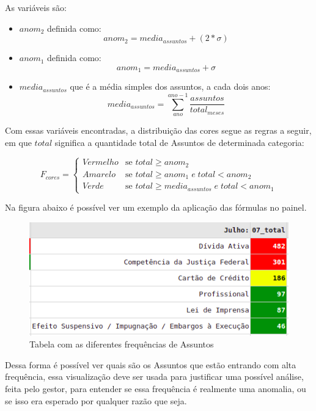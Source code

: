 As variáveis são:
\begin{itemize}
	\item $anom_2$ definida como: $$anom_2 = media_{assuntos} + (2*\sigma)$$
	
	\item $anom_1$ definida como: $$anom_1 = media_{assuntos} + \sigma$$
	
	\item $media_{assuntos}$ que é a média simples dos assuntos, a cada dois anos:
	$$media_{assuntos} = \sum\limits_{ano}^{ano-1}\frac{assuntos}{total_{meses}}$$
\end{itemize}

Com essas variáveis encontradas, a distribuição das cores segue as regras a seguir, em que $total$ significa a quantidade total de Assuntos de determinada categoria:

\begin{equation}
	F_{cores} =
	\begin{cases}
		Vermelho & \text{se $total \geq anom_2$}\\
		Amarelo & \text{se $total \geq anom_1 \;e\; total < anom_2$}\\
		Verde & \text{se $total \geq media_{assuntos} \;e\; total < anom_1$}
	\end{cases}       
\end{equation}

Na figura abaixo é possível ver um exemplo da aplicação das fórmulas no painel.

\begin{figure}[h]
	\centering
	\includegraphics[scale=0.65]{./figures/cap2/exemplo_painel.png}
	\caption{Tabela com as diferentes frequências de Assuntos}
\end{figure}

Dessa forma é possível ver quais são os Assuntos que estão entrando com alta frequência, essa visualização deve ser usada para justificar uma possível análise, feita pelo gestor, para entender se essa frequência é realmente uma anomalia, ou se isso era esperado por qualquer razão que seja.

